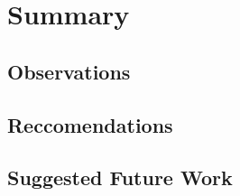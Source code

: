 \chapter{Summary}\label{ch:summary}

\section{Observations}

\section{Reccomendations}

\section{Suggested Future Work}
